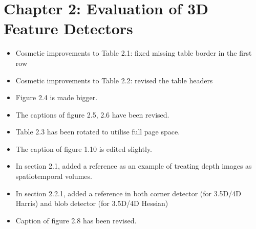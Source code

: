 \documentclass[10pt, a4paper]{article}
\begin{document}
\section{Chapter 2: Evaluation of 3D Feature Detectors}

\begin{itemize}
\item Cosmetic improvements to Table 2.1: fixed missing table border in the first row
\item Cosmetic improvements to Table 2.2: revised the table headers
\item Figure 2.4 is made bigger.
\item The captions of figure 2.5, 2.6 have been revised.
\item Table 2.3 has been rotated to utilise full page space. 
\item The caption of figure 1.10 is edited slightly.
\item In section 2.1, added a reference \cite{Hadfield2013} as an example of treating depth images as spatiotemporal volumes.
\item In section 2.2.1, added a reference \cite{Hadfield2013} in both corner detector (for 3.5D/4D Harris) and blob detector (for 3.5D/4D Hessian)
\item Caption of figure 2.8 has been revised.
\end{itemize}
\end{document}
